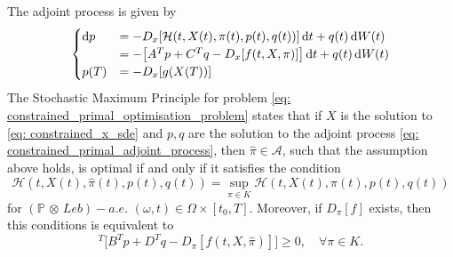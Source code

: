The adjoint process is given by
\begin{equation}
\begin{cases}
            \mathop{}\!\mathrm{d} {p} &= -D_x[\mathcal{H}(t, X(t), \pi(t), p(t), q(t))] \mathop{}\!\mathrm{d} t + q(t) \mathop{}\!\mathrm{d} W(t)\\
            &= -\big[ A^T p + C^T q - D_x[f(t, X, \pi)] \big] \mathop{}\!\mathrm{d} t +  q(t) \mathop{}\!\mathrm{d} W(t)\\
            {p}(T) &= - D_x [g({X}(T))]
        \end{cases} \label{eq: constrained_primal_adjoint_process}
\end{equation}
The Stochastic Maximum Principle for problem \eqref{eq: constrained_primal_optimisation_problem} states that if $X$ is the solution to \eqref{eq: constrained_x_sde} and $p, q$ are the solution to the adjoint process \eqref{eq: constrained_primal_adjoint_process}, then $\hat{\pi} \in \mathcal{A}$, such that the assumption above holds, is optimal if and only if it satisfies the condition
\begin{equation*}
     \mathcal{H}(t, X(t), \hat{\pi}(t), p(t), q(t)) = \sup_{\pi \in K} \mathcal{H}(t, X(t), {\pi}(t), p(t), q(t))
\end{equation*}
for $(\mathbb{P} \, \otimes \, Leb)-a.e.$ $(\omega, t) \in \Omega \times [t_0, T]$. Moreover, if $D_\pi[f]$ exists, then this conditions is equivalent to
\begin{equation*}
    [\hat{\pi} - \pi]^T \bigg[ B^T p + D^T q - D_\pi [f(t, X, \hat{\pi})] \bigg] \ge 0, \quad \forall \pi \in K.
\end{equation*}


